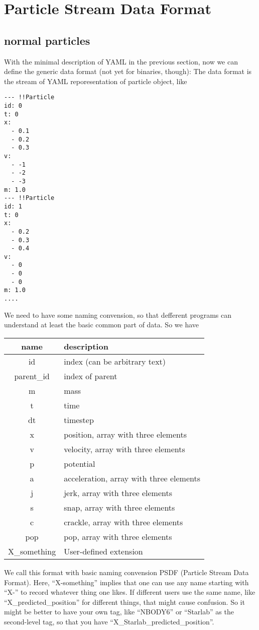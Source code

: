 \documentclass[12pt]{article}
\begin{document}
\section{Particle Stream Data Format}


\subsection{normal particles}

With the  minimal description of YAML in the previous section, now
we can define the generic data format (not yet for binaries, though):
The data format is the stream of YAML reporesentation of particle
object, like

\begin{verbatim}
--- !!Particle
id: 0
t: 0
x:
  - 0.1
  - 0.2
  - 0.3
v:
  - -1
  - -2
  - -3
m: 1.0
--- !!Particle
id: 1
t: 0
x:
  - 0.2
  - 0.3
  - 0.4
v:
  - 0
  - 0
  - 0
m: 1.0
....
\end{verbatim}
We need to have some naming convension, so that defferent programs can
understand at least the basic common part of data. So we have

\begin{center}
\begin{tabular}{|c|l|}
\hline
name & description\\
\hline
id & index (can be arbitrary text)\\
parent\_id & index  of parent\\
m & mass\\
t & time\\
dt & timestep\\
x  & position, array with three elements\\
v  & velocity, array with three elements\\
p  & potential\\
a  & acceleration, array with three elements\\
j  & jerk, array with three elements\\
s  & snap, array with three elements\\
c  & crackle, array with three elements\\
pop  & pop, array with three elements\\
X\_something & User-defined extension\\
\hline
\end{tabular}
\end{center}

We call this format with basic naming convension PSDF (Particle Stream
Data Format). Here, ``X-something'' implies that one can use any name
starting with ``X-'' to record whatever thing one likes. If different
users use the same name, like ``X\_predicted\_position'' for different
things, that might cause confusion. So it might be better to have your
own tag, like ``NBODY6'' or ``Starlab'' as the second-level tag, so
that you have ``X\_Starlab\_predicted\_position''.
\end{document}
